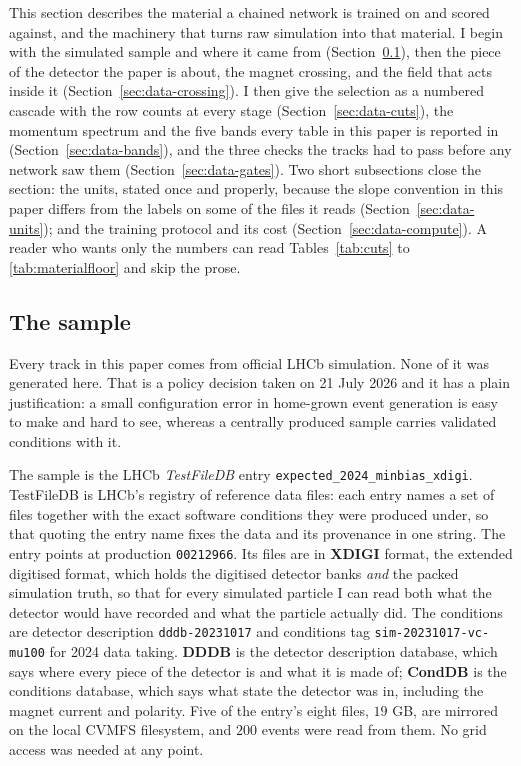 \documentclass[11pt,a4paper]{article}
\begin{document}
This section describes the material a chained network is trained on and scored
against, and the machinery that turns raw simulation into that material. I
begin with the simulated sample and where it came from
(Section~\ref{sec:data-sample}), then the piece of the detector the paper is
about, the magnet crossing, and the field that acts inside it
(Section~\ref{sec:data-crossing}). I then give the selection as a numbered
cascade with the row counts at every stage (Section~\ref{sec:data-cuts}), the
momentum spectrum and the five bands every table in this paper is reported in
(Section~\ref{sec:data-bands}), and the three checks the tracks had to pass
before any network saw them (Section~\ref{sec:data-gates}). Two short
subsections close the section: the units, stated once and properly, because the
slope convention in this paper differs from the labels on some of the files it
reads (Section~\ref{sec:data-units}); and the training protocol and its cost
(Section~\ref{sec:data-compute}). A reader who wants only the numbers can read
Tables~\ref{tab:cuts} to \ref{tab:materialfloor} and skip the prose.

\subsection{The sample}
\label{sec:data-sample}

Every track in this paper comes from official LHCb simulation. None of it was
generated here. That is a policy decision taken on 21 July 2026 and it has a
plain justification: a small configuration error in home-grown event generation
is easy to make and hard to see, whereas a centrally produced sample carries
validated conditions with it.

The sample is the LHCb \emph{TestFileDB} entry
\texttt{expected\_2024\_minbias\_xdigi}. TestFileDB is LHCb's registry of
reference data files: each entry names a set of files together with the exact
software conditions they were produced under, so that quoting the entry name
fixes the data and its provenance in one string. The entry points at production
\texttt{00212966}. Its files are in \textbf{XDIGI} format, the extended digitised
format, which holds the digitised detector banks \emph{and} the packed simulation
truth, so that for every simulated particle I can read both what the detector
would have recorded and what the particle actually did. The conditions are
detector description \texttt{dddb-20231017} and conditions tag
\texttt{sim-20231017-vc-mu100} for 2024 data taking. \textbf{DDDB} is the
detector description database, which says where every piece of the detector is
and what it is made of; \textbf{CondDB} is the conditions database, which says
what state the detector was in, including the magnet current and polarity. Five
of the entry's eight files, $19$ GB, are mirrored on the local CVMFS filesystem,
and $200$ events were read from them. No grid access was needed at any point.
\end{document}
